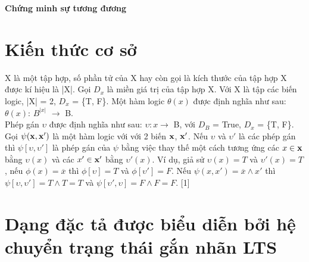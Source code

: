 \documentclass{article}
\begin{document}
	\begin{center}
		\textbf{\large Chứng minh sự tương đương}
	\end{center}
	\begin{flushleft}
		\section{Kiến thức cơ sở}
			X là một tập hợp, số phần tử của X hay còn gọi là kích thước của tập hợp X được kí hiệu là |X|. Gọi $D_x$ là miền giá trị của tập hợp X. Với X là tập các biến logic, |X| = 2, $D_x$ = \{T, F\}. Một hàm logic $\theta(x)$ được định nghĩa như sau: $\theta(x)$: $B^{|x|}$ $\to$ B.\\
			Phép gán $\upsilon$ được định nghĩa như sau: $\upsilon: x \to$ B, với $D_B$ = True, $D_x$ = \{T, F\}.\\
			Gọi $\psi(\bf x, \bf x')$ là một hàm logic với với 2 biến $\bf x$, $\bf x'$. Nếu $\upsilon$ và $\upsilon'$ là các phép gán thì $\psi[\upsilon, \upsilon']$ là phép gán của $\psi$ bằng việc thay thế một cách tương ứng các $x \in \bf x$ bằng $\upsilon(x)$ và các $x' \in \bf x'$ bằng $\upsilon'(x)$. Ví dụ, giả sử $\upsilon(x) = T$ và $\upsilon'(x) = T$, nếu $\phi(x) = \overline x$ thì $\phi [\upsilon] = T$ và $\phi[\upsilon'] = F$. Nếu $\psi(x, x') = \overline x \land x'$ thì $\psi[\upsilon, \upsilon'] = T \land T = T$ và $\psi[\upsilon', \upsilon] = F \land F = F$. [1]
		\section{Dạng đặc tả được biểu diễn bởi hệ chuyển trạng thái gắn nhãn LTS}

\end{flushleft}
\end{document}
